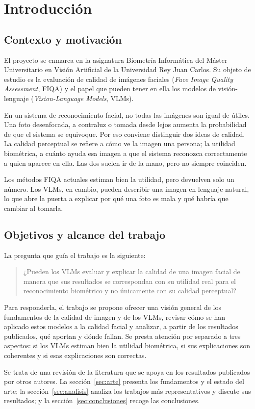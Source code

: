 \section{Introducción}
\label{sec:introduccion}
\subsection{Contexto y motivación}
El proyecto se enmarca en la asignatura Biometría Informática del Máster Universitario en Visión Artificial de la Universidad Rey Juan Carlos. Su objeto de estudio es la evaluación de calidad de imágenes faciales (\textit{Face Image Quality Assessment}, FIQA) y el papel que pueden tener en ella los modelos de visión-lenguaje (\textit{Vision-Language Models}, VLMs).

En un sistema de reconocimiento facial, no todas las imágenes son igual de útiles. Una foto desenfocada, a contraluz o tomada desde lejos aumenta la probabilidad de que el sistema se equivoque. Por eso conviene distinguir dos ideas de calidad. La calidad perceptual se refiere a cómo ve la imagen una persona; la utilidad biométrica, a cuánto ayuda esa imagen a que el sistema reconozca correctamente a quien aparece en ella. Las dos suelen ir de la mano, pero no siempre coinciden.

Los métodos FIQA actuales estiman bien la utilidad, pero devuelven solo un número. Los VLMs, en cambio, pueden describir una imagen en lenguaje natural, lo que abre la puerta a explicar por qué una foto es mala y qué habría que cambiar al tomarla.

\subsection{Objetivos y alcance del trabajo}
La pregunta que guía el trabajo es la siguiente:
\begin{quote}
¿Pueden los VLMs evaluar y explicar la calidad de una imagen facial de manera que sus resultados se correspondan con su utilidad real para el reconocimiento biométrico y no únicamente con su calidad perceptual?
\end{quote}
Para responderla, el trabajo se propone ofrecer una visión general de los fundamentos de la calidad de imagen y de los VLMs, revisar cómo se han aplicado estos modelos a la calidad facial y analizar, a partir de los resultados publicados, qué aportan y dónde fallan. Se presta atención por separado a tres aspectos: si los VLMs estiman bien la utilidad biométrica, si sus explicaciones son coherentes y si esas explicaciones son correctas.

Se trata de una revisión de la literatura que se apoya en los resultados publicados por otros autores. La sección~\ref{sec:arte} presenta los fundamentos y el estado del arte; la sección~\ref{sec:analisis} analiza los trabajos más representativos y discute sus resultados; y la sección~\ref{sec:conclusiones} recoge las conclusiones.
